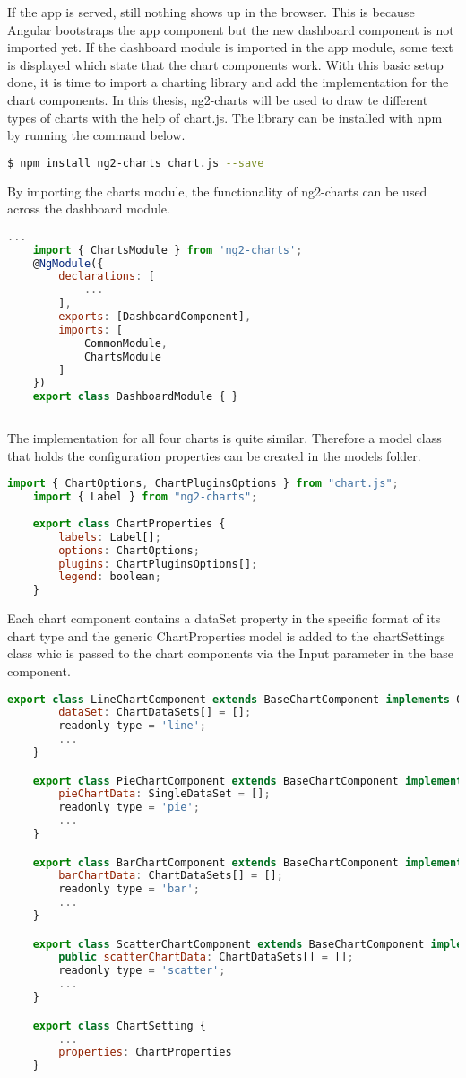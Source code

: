 If the app is served, still nothing shows up in the browser. This is because Angular bootstraps the app component but the new dashboard component is not imported yet. If the dashboard module is imported in the app module, some text is displayed which state that the chart components work. With this basic setup done, it is time to import a charting library and add the implementation for the chart components. In this thesis, ng2-charts will be used to draw te different types of charts with the help of chart.js. The library can be installed with npm by running the command below.

\begin{lstlisting}[language=bash]
	$ npm install ng2-charts chart.js --save
\end{lstlisting}

By importing the charts module, the functionality of ng2-charts can be used across the dashboard module.

\begin{lstlisting}[language=JavaScript] 	
	...
	import { ChartsModule } from 'ng2-charts';
	@NgModule({
		declarations: [
			...
		],
		exports: [DashboardComponent],
		imports: [
			CommonModule,
			ChartsModule
		]
	})
	export class DashboardModule { }
	
\end{lstlisting}

The implementation for all four charts is quite similar. Therefore a model class that holds the configuration properties can be created in the models folder.

\begin{lstlisting}[language=JavaScript] 	
	import { ChartOptions, ChartPluginsOptions } from "chart.js";
	import { Label } from "ng2-charts";
	
	export class ChartProperties {
		labels: Label[];
		options: ChartOptions;
		plugins: ChartPluginsOptions[];
		legend: boolean;
	}
\end{lstlisting}

Each chart component contains a dataSet property in the specific format of its chart type and the generic ChartProperties model is added to the chartSettings class whic is passed to the chart components via the Input parameter in the base component.
\begin{lstlisting}[language=JavaScript] 	
	export class LineChartComponent extends BaseChartComponent implements OnInit {
		dataSet: ChartDataSets[] = [];
		readonly type = 'line';
		...
	}

	export class PieChartComponent extends BaseChartComponent implements OnInit {
		pieChartData: SingleDataSet = [];
		readonly type = 'pie';
		...
	}

	export class BarChartComponent extends BaseChartComponent implements OnInit {
		barChartData: ChartDataSets[] = [];
		readonly type = 'bar';
		...
	}

	export class ScatterChartComponent extends BaseChartComponent implements OnInit {
		public scatterChartData: ChartDataSets[] = [];
		readonly type = 'scatter';
		...
	}

	export class ChartSetting {
		...
		properties: ChartProperties
	}
		
\end{lstlisting}

